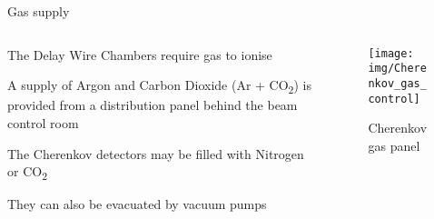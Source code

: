 \documentclass[9pt]{beamer}
\begin{document}
\begin{frame}{Gas supply}
  \begin{columns}
    \begin{column}{.6\textwidth}
    The Delay Wire Chambers require gas to ionise
    \vspace{0.5cm}

    A supply of Argon and Carbon Dioxide (Ar + CO\textsubscript{2}) is provided from a distribution panel behind the beam control room
    \vspace{0.5cm}

    The Cherenkov detectors may be filled with Nitrogen or CO\textsubscript{2}
    \vspace{0.5cm}

    They can also be evacuated by vacuum pumps
    \end{column}
    \begin{column}{.4\textwidth}
    \vspace*{-0.5cm}
    \begin{figure}\texttt{[image: img/Cherenkov\_gas\_control]}\vspace*{-0.2cm}\caption{Cherenkov gas panel}\end{figure}\vspace*{-1cm}
    \end{column}
  \end{columns}
\end{frame}
\end{document}
